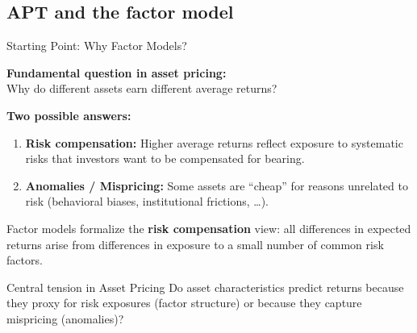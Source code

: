 \documentclass[aspectratio=169]{beamer}
\begin{document}
\subsection{APT and the factor model}
%
\begin{frame}{Starting Point: Why Factor Models?}

\textbf{Fundamental question in asset pricing:}\\
Why do different assets earn different average returns?

\vspace{0.7em}
\textbf{Two possible answers:}
\begin{enumerate}
    \item \textbf{Risk compensation:} Higher average returns reflect exposure to systematic risks that investors want to be compensated for bearing.
    \item \textbf{Anomalies / Mispricing:} Some assets are ``cheap'' for reasons unrelated to risk (behavioral biases, institutional frictions, \ldots).
\end{enumerate}

\vspace{0.7em}
Factor models formalize the \textbf{risk compensation} view: all differences in expected returns arise from differences in exposure to a small number of common risk factors.

\vspace{0.5em}
\begin{alertblock}{Central tension in Asset Pricing}
Do asset characteristics predict returns because they proxy for risk exposures (factor structure) or because they capture mispricing (anomalies)?
\end{alertblock}
\end{frame}
%
%
\end{document}
